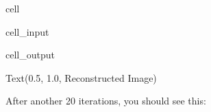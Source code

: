 \documentclass[letterpaper,10pt,english]{jupyterBook}
\begin{document}
\begin{sphinxuseclass}{cell}\begin{sphinxVerbatimInput}

\begin{sphinxuseclass}{cell_input}
\begin{sphinxVerbatim}[commandchars=\\\{\}]
  
\end{sphinxVerbatim}

\end{sphinxuseclass}\end{sphinxVerbatimInput}
\begin{sphinxVerbatimOutput}

\begin{sphinxuseclass}{cell_output}
\begin{sphinxVerbatim}[commandchars=\\\{\}]
Text(0.5, 1.0, \PYGZsq{}Reconstructed Image\PYGZsq{})
\end{sphinxVerbatim}

\noindent{}

\end{sphinxuseclass}\end{sphinxVerbatimOutput}

\end{sphinxuseclass}
\sphinxAtStartPar
After another 20 iterations, you should see this:
\end{document}

